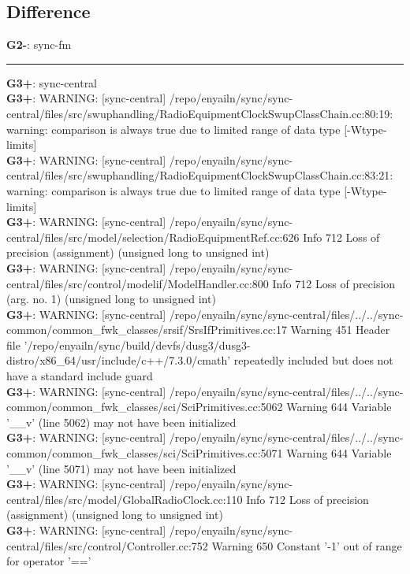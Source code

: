 \documentclass[12pt,twoside]{article}
\begin{document}
\subsection{Difference} 
\textbf{G2-}: sync-fm 
\rule{\textwidth}{0.5pt} 
\textbf{G3+}: sync-central\\ 
\textbf{G3+}: WARNING: [sync-central] /repo/enyailn/sync/sync-central/files/src/swuphandling/RadioEquipmentClockSwupClassChain.cc:80:19: warning: comparison is always true due to limited range of data type [-Wtype-limits]\\ 
\textbf{G3+}: WARNING: [sync-central] /repo/enyailn/sync/sync-central/files/src/swuphandling/RadioEquipmentClockSwupClassChain.cc:83:21: warning: comparison is always true due to limited range of data type [-Wtype-limits]\\ 
\textbf{G3+}: WARNING: [sync-central] /repo/enyailn/sync/sync-central/files/src/model/selection/RadioEquipmentRef.cc:626 Info 712 Loss of precision (assignment) (unsigned long to unsigned int)\\ 
\textbf{G3+}: WARNING: [sync-central] /repo/enyailn/sync/sync-central/files/src/control/modelif/ModelHandler.cc:800 Info 712 Loss of precision (arg. no. 1) (unsigned long to unsigned int)\\ 
\textbf{G3+}: WARNING: [sync-central] /repo/enyailn/sync/sync-central/files/../../sync-common/common\_fwk\_classes/srsif/SrsIfPrimitives.cc:17 Warning 451 Header file '/repo/enyailn/sync/build/devfs/dusg3/dusg3-distro/x86\_64/usr/include/c++/7.3.0/cmath' repeatedly included but does not have a standard include guard\\ 
\textbf{G3+}: WARNING: [sync-central] /repo/enyailn/sync/sync-central/files/../../sync-common/common\_fwk\_classes/sci/SciPrimitives.cc:5062 Warning 644 Variable '\_\_v' (line 5062) may not have been initialized\\ 
\textbf{G3+}: WARNING: [sync-central] /repo/enyailn/sync/sync-central/files/../../sync-common/common\_fwk\_classes/sci/SciPrimitives.cc:5071 Warning 644 Variable '\_\_v' (line 5071) may not have been initialized\\ 
\textbf{G3+}: WARNING: [sync-central] /repo/enyailn/sync/sync-central/files/src/model/GlobalRadioClock.cc:110 Info 712 Loss of precision (assignment) (unsigned long to unsigned int)\\ 
\textbf{G3+}: WARNING: [sync-central] /repo/enyailn/sync/sync-central/files/src/control/Controller.cc:752 Warning 650 Constant '-1' out of range for operator '=='\\ 
  
\end{document}
